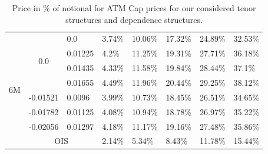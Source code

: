\documentclass[12pt]{article}
\begin{document}
\begin{table}[H]
\begin{tabular}{|c||c||c||c|c|c|c|c|}
    \multirow{8}{*}{6M}& \multirow{4}{*}{0.0} & \multicolumn{1}{l||}{0.0}               & \multicolumn{1}{l|}{3.74\%}    & \multicolumn{1}{l|}{10.06\%}   & \multicolumn{1}{l|}{17.32\%} & \multicolumn{1}{l|}{24.89\%} & \multicolumn{1}{l|}{32.53\%}\\\cline{3-8}
                        &                          & \multicolumn{1}{l||}{0.01225}      & \multicolumn{1}{l|}{4.2\%} & \multicolumn{1}{l|}{11.25\%}      & \multicolumn{1}{l|}{19.31\%} & \multicolumn{1}{l|}{27.71\%} & \multicolumn{1}{l|}{36.18\%}\\\cline{3-8}
                        &                          & \multicolumn{1}{l||}{0.01435}      & \multicolumn{1}{l|}{4.33\%} &  \multicolumn{1}{l|}{11.58\%}     & \multicolumn{1}{l|}{19.84\%} & \multicolumn{1}{l|}{28.44\%} & \multicolumn{1}{l|}{37.1\%}\\\cline{3-8}
                        &                          & \multicolumn{1}{l||}{0.01655}      & \multicolumn{1}{l|}{4.49\%} &   \multicolumn{1}{l|}{11.96\%}    & \multicolumn{1}{l|}{20.44\%} & \multicolumn{1}{l|}{29.25\%} & \multicolumn{1}{l|}{38.12\%}\\\cline{2-8}
                        & \multicolumn{1}{l||}{-0.01521} & \multicolumn{1}{l||}{0.0096} & \multicolumn{1}{l|}{3.99\%} & \multicolumn{1}{l|}{10.73\%}      & \multicolumn{1}{l|}{18.45\%} & \multicolumn{1}{l|}{26.51\%} & \multicolumn{1}{l|}{34.65\%}\\\cline{2-8}
                        & \multicolumn{1}{l||}{-0.01782} & \multicolumn{1}{l||}{0.01125} & \multicolumn{1}{l|}{4.08\%} & \multicolumn{1}{l|}{10.94\%}     & \multicolumn{1}{l|}{18.78\%} & \multicolumn{1}{l|}{26.97\%} & \multicolumn{1}{l|}{35.22\%}\\\cline{2-8}
                        & \multicolumn{1}{l||}{-0.02056} & \multicolumn{1}{l||}{0.01297} & \multicolumn{1}{l|}{4.18\%} & \multicolumn{1}{l|}{11.17\%}     & \multicolumn{1}{l|}{19.16\%} & \multicolumn{1}{l|}{27.48\%} & \multicolumn{1}{l|}{35.86\%}\\\cline{2-8}
                        &  \multicolumn{2}{|c||}{OIS}                                   &  \multicolumn{1}{l|}{2.14\%} & \multicolumn{1}{l|}{5.34\%}      & \multicolumn{1}{l|}{8.43\%} & \multicolumn{1}{l|}{11.78\%} & \multicolumn{1}{l|}{15.44\%}\\ \hline
     \end{tabular}
    \caption{Price in \% of notional for ATM Cap prices for our considered tenor structures
    and dependence structures.}
    \label{tab:AtmCapPrice}
\end{table}
\end{document}
